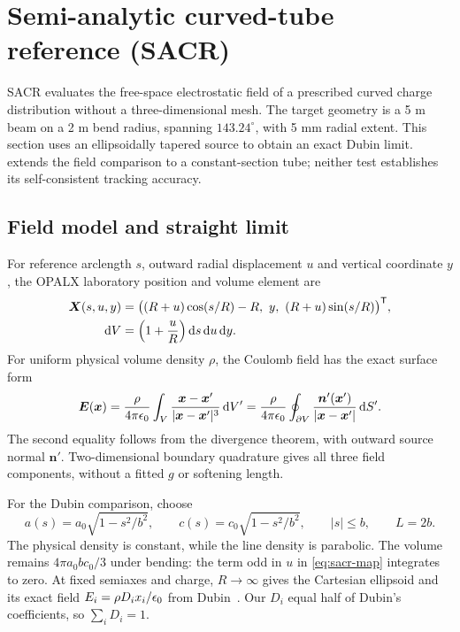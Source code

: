 \section{Semi-analytic curved-tube reference (SACR)}
\label{sec:sacr}
SACR evaluates the free-space electrostatic field of a prescribed curved charge
distribution without a three-dimensional mesh. The target geometry is a 5 m
beam on a 2 m bend radius, spanning $143.24^\circ$, with 5 mm radial extent.
This section uses an ellipsoidally tapered source to obtain an exact Dubin
limit.  extends the field comparison to a constant-section
tube; neither test establishes its self-consistent tracking accuracy.

\subsection{Field model and straight limit}
For reference arclength $s$, outward radial displacement $u$ and vertical
coordinate $y$, the OPALX laboratory position and volume element are
\begin{align}
 \bm X(s,u,y)&=\big((R+u)\cos(s/R)-R,\ y,\ (R+u)\sin(s/R)\big)^\mathsf T,\\
 \mathrm d V&=\left(1+\frac{u}{R}\right)\mathrm d s\,\mathrm d u\,\mathrm d y.
 \label{eq:sacr-map}
\end{align}
For uniform physical volume density $\rho$, the Coulomb field has the exact
surface form
\begin{equation}
 \bm E(\bm x)=\frac{\rho}{4\pi\epsilon_0}
 \int_V\frac{\bm x-\bm x'}{|\bm x-\bm x'|^3}\,\mathrm d V'
 =\frac{\rho}{4\pi\epsilon_0}
 \oint_{\partial V}\frac{\bm n'(\bm x')}{|\bm x-\bm x'|}\,\mathrm d S'.
 \label{eq:sacr-surface}
\end{equation}
The second equality follows from the divergence theorem, with outward source
normal $\bm n'$. Two-dimensional boundary quadrature gives all three field
components, without a fitted $g$ or softening length.

For the Dubin comparison, choose
\begin{equation}
 a(s)=a_0\sqrt{1-s^2/b^2},\qquad
 c(s)=c_0\sqrt{1-s^2/b^2},\qquad |s|\le b,\qquad L=2b.
 \label{eq:sacr-taper}
\end{equation}
The physical density is constant, while the line density is parabolic.
The volume remains $4\pi a_0bc_0/3$ under bending: the term odd in $u$ in
\cref{eq:sacr-map} integrates to zero. At fixed semiaxes and charge,
$R\to\infty$ gives the Cartesian ellipsoid and its exact field
$E_i=\rho D_i x_i/\epsilon_0$ from Dubin~\cite{dubin}. Our $D_i$ equal half of
Dubin's coefficients, so $\sum_iD_i=1$.

